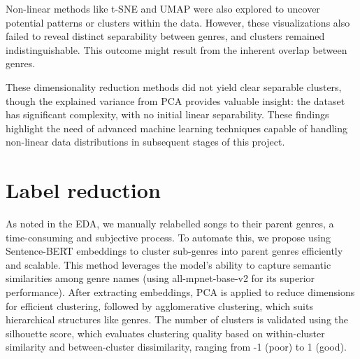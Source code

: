 \documentclass{article}
\begin{document}
Non-linear methods like t-SNE and UMAP were also explored to uncover potential patterns or clusters within the data. However, these visualizations also failed to reveal distinct separability between genres, and clusters remained indistinguishable. This outcome might result from the inherent overlap between genres.

These dimensionality reduction methods did not yield clear separable clusters, though the explained variance from PCA provides valuable insight: the dataset has significant complexity, with no initial linear separability. These findings highlight the need of advanced machine learning techniques capable of handling non-linear data distributions in subsequent stages of this project. 

\section{Label reduction}

As noted in the EDA, we manually relabelled songs to their parent genres, a time-consuming and subjective process. To automate this, we propose using Sentence-BERT \cite{Reimers2019} embeddings to cluster sub-genres into parent genres efficiently and scalable. This method leverages the model's ability to capture semantic similarities among genre names (using all-mpnet-base-v2 for its superior performance). After extracting embeddings, PCA is applied to reduce dimensions for efficient clustering, followed by agglomerative clustering, which suits hierarchical structures like genres. The number of clusters is validated using the silhouette score, which evaluates clustering quality based on within-cluster similarity and between-cluster dissimilarity, ranging from -1 (poor) to 1 (good). 
\end{document}
